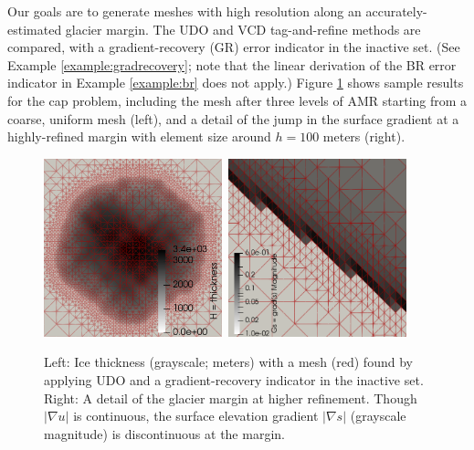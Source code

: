 \documentclass[]{interact}
\theoremstyle{plain}%
\theoremstyle{definition}
\theoremstyle{remark}
\newcommand{\grad}{\nabla}
\begin{document}
Our goals are to generate meshes with high resolution along an accurately-estimated glacier margin.  The UDO and VCD tag-and-refine methods are compared, with a gradient-recovery (GR) error indicator in the inactive set.  (See Example \ref{example:gradrecovery}; note that the linear derivation of the BR error indicator in Example \ref{example:br} does not apply.)  Figure \ref{fig:glacier} shows sample results for the cap problem, including the mesh after three levels of AMR starting from a coarse, uniform mesh (left), and a detail of the jump in the surface gradient at a highly-refined margin with element size around $h = 100$ meters (right).

\begin{figure}[ht]
\centering
\mbox{\includegraphics[width=0.46\textwidth]{static/glacier/thickness.png} \qquad \includegraphics[width=0.46\textwidth]{static/glacier/detail.png}}
\caption{Left:  Ice thickness (grayscale; meters) with a mesh (red) found by applying UDO and a gradient-recovery indicator in the inactive set.  Right:  A detail of the glacier margin at higher refinement.  Though $|\grad u|$ is continuous, the surface elevation gradient $|\grad s|$ (grayscale magnitude) is discontinuous at the margin.}
\label{fig:glacier}
\end{figure}
\end{document}
